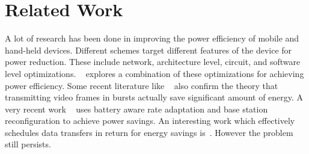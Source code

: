 \section{Related Work}
A lot of research has been done in improving the power efficiency of mobile and hand-held devices. Different schemes target different features of the device for power reduction. These include network, architecture level, circuit, and software level optimizations. ~\cite{mohapatra_mm03} explores a combination of these optimizations for achieving power efficiency. Some recent literature like ~\cite{mobiarch,movid} also confirm the theory that transmitting video frames in bursts actually save significant amount of energy. A very recent work ~\cite{ucsd_wcnc} uses battery aware rate adaptation and base station reconfiguration to achieve power savings. An interesting work which effectively schedules data transfers in return for energy savings is~\cite{balasubramanian_imc09}. However the problem still persists.

